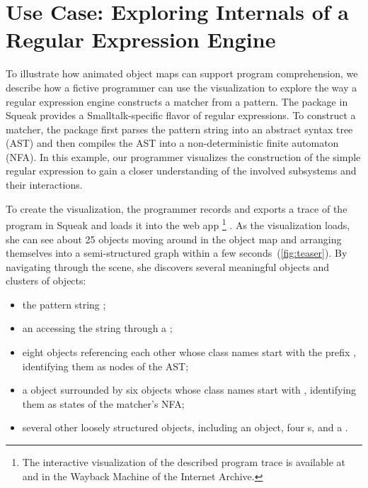 \section{Use Case: Exploring Internals of a Regular Expression Engine}
\label{sec:use_case}

To illustrate how animated object maps can support program comprehension, we describe how a fictive programmer can use the \tfd{} visualization to explore the way a regular expression engine constructs a matcher from a pattern.
The  package in Squeak provides a Smalltalk-specific flavor of regular expressions.
To construct a matcher, the package first parses the pattern string into an abstract syntax tree (AST) and then compiles the AST into a non-deterministic finite automaton (NFA).
In this example, our programmer visualizes the construction of the simple regular expression  to gain a closer understanding of the involved subsystems and their interactions.

To create the visualization, the programmer records and exports a trace of the program  in Squeak and loads it into the \tfd{} web app%
\footnote{The interactive visualization of the described program trace is available at  and in the Wayback Machine of the Internet Archive.}%
.
As the visualization loads, she can see about 25 objects moving around in the object map and arranging themselves into a semi-structured graph within a few seconds~(\cref{fig:teaser}).
By navigating through the scene, she discovers several meaningful objects and clusters of objects:

\begin{itemize}
	\item the pattern string ;
	\item an  accessing the string through a ;
	\item eight objects referencing each other whose class names start with the prefix , identifying them as nodes of the AST;
	\item a  object surrounded by six objects whose class names start with , identifying them as states of the matcher's NFA;
	\item several other loosely structured objects, including an  object, four s, and a .
\end{itemize}

